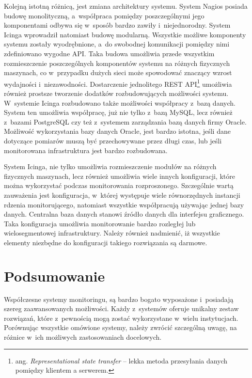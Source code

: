 Kolejną istotną różnicą, jest zmiana architektury systemu. System
Nagios posiada budowę monolityczną, a~współpraca pomiędzy
poszczególnymi jego komponentami odbywa się w~sposób bardzo zawiły
i~niejednorodny. System Icinga wprowadził natomiast budowę
modularną. Wszystkie możliwe komponenty systemu zostały wyodrębnione,
a~do swobodnej komunikacji pomiędzy nimi zdefiniowano wygodne
API. Taka budowa umożliwia przede wszystkim rozmieszczenie
poszczególnych komponentów systemu na różnych fizycznych maszynach, co
w~przypadku dużych sieci może spowodować znaczący wzrost wydajności
i~niezawodności. Dostarczenie jednolitego REST API\footnote{ang. {\em
    Representational state transfer} -- lekka metoda przesyłania
  danych pomiędzy klientem a serwerem.} umożliwia
również prostsze tworzenie dodatków rozbudowujących możliwości
systemu.  W~systemie Icinga rozbudowano także możliwości współpracy
z~bazą danych. System ten umożliwia współpracę, już nie tylko z~bazą
MySQL, lecz również z~bazami PostgreSQL czy też z~systemem zarządzania
bazą danych firmy Oracle. Możliwość wykorzystania bazy danych Oracle,
jest bardzo istotna, jeśli dane dotyczące pomiarów muszą być
przechowywane przez długi czas, lub jeśli monitorowana infrastruktura
jest bardzo rozbudowana.

System Icinga, nie tylko umożliwia rozmieszczenie modułów na różnych
fizycznych maszynach, lecz również umożliwia wiele innych
konfiguracji, które można wykorzystać podczas monitorowania
rozproszonego. Szczególnie wartą zauważenia jest konfiguracja,
w~której występuje wiele równorzędnych instancji rdzenia
monitorującego, natomiast wszystkie współpracują używając jednej bazy
danych. Centralna baza danych stanowi źródło danych dla interfejsu
graficznego. Taka konfiguracja umożliwia monitorowanie bardzo rozległej
lub wielosegmentowej infrastruktury. Należy również nadmienić, iż
wszystkie elementy niezbędne do konfiguracji takiego rozwiązania są
darmowe.

\section[Podsumowanie][Podsumowanie]{Podsumowanie}

Współczesne systemy monitoringu, są bardzo bogato wyposażone
i~posiadają szereg zaawansowanych możliwości. Każdy z~systemów oferuje
unikalny zestaw rozwiązań, które z~pewnością mogą zostać wykorzystane
w~wielu instytucjach. Porównując wszystkie omówione systemy, należy
zwrócić szczególną uwagę, na różnice w~ich możliwych zastosowaniach
docelowych.


